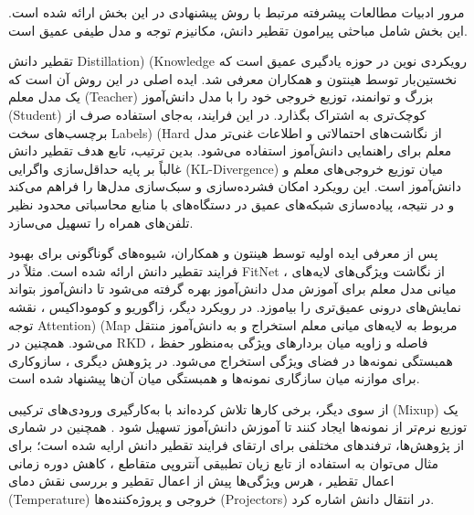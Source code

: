 



مرور ادبیات مطالعات پیشرفته مرتبط با روش پیشنهادی در این بخش ارائه شده است. این بخش شامل مباحثی پیرامون تقطیر دانش، مکانیزم توجه و مدل طیفی عمیق است.


تقطیر دانش Distillation) (Knowledge رویکردی نوین در حوزه یادگیری عمیق است که نخستین‌بار توسط هینتون و همکاران \cite{hinton2015distillingknowledgeneuralnetwork} معرفی شد. ایده اصلی در این روش آن است که یک مدل معلم (Teacher) بزرگ و توانمند، توزیع خروجی خود را با مدل دانش‌آموز (Student) کوچک‌تری به اشتراک بگذارد. در این فرایند، به‌جای استفاده صرف از برچسب‌های سخت Labels) (Hard از نگاشت‌های احتمالاتی و اطلاعات غنی‌تر مدل معلم برای راهنمایی دانش‌آموز استفاده می‌شود. بدین ترتیب، تابع هدف تقطیر دانش غالباً بر پایه حداقل‌سازی واگرایی  (KL-Divergence) میان توزیع خروجی‌های معلم و دانش‌آموز است. این رویکرد امکان فشرده‌سازی و سبک‌سازی مدل‌ها را فراهم می‌کند و در نتیجه، پیاده‌سازی شبکه‌های عمیق در دستگاه‌های با منابع محاسباتی محدود نظیر تلفن‌های همراه را تسهیل می‌سازد.

پس از معرفی ایده اولیه توسط هینتون و همکاران، شیوه‌های گوناگونی برای بهبود فرایند تقطیر دانش ارائه شده است. مثلاً در FitNet \cite{romero2015fitnetshintsdeepnets}، از نگاشت ویژگی‌های لایه‌های میانی مدل معلم برای آموزش مدل دانش‌آموز بهره گرفته می‌شود تا دانش‌آموز بتواند نمایش‌های درونی عمیق‌تری را بیاموزد. در رویکرد دیگر، زاگوریو و کوموداکیس \cite{zagoruyko2017wideresidualnetworks}، نقشه توجه Attention) (Map مربوط به لایه‌های میانی معلم استخراج و به دانش‌آموز منتقل می‌شود. همچنین در RKD \cite{park2019relationalknowledgedistillation}، فاصله و زاویه میان بردارهای ویژگی به‌منظور حفظ همبستگی نمونه‌ها در فضای ویژگی استخراج می‌شود. در پژوهش دیگری \cite{peng2019correlationcongruenceknowledgedistillation}، سازوکاری برای موازنه میان سازگاری نمونه‌ها و همبستگی میان آن‌ها پیشنهاد شده است.

از سوی دیگر، برخی کارها تلاش کرده‌اند با به‌کارگیری ورودی‌های ترکیبی (Mixup) یک توزیع نرم‌تر از نمونه‌ها ایجاد کنند تا آموزش دانش‌آموز تسهیل شود \cite{zhao2021similaritytransferknowledgedistillation}. همچنین در شماری از پژوهش‌ها، ترفندهای مختلفی برای ارتقای فرایند تقطیر دانش ارایه شده است؛ برای مثال می‌توان به استفاده از تابع زیان تطبیقی آنتروپی متقاطع \cite{s20164616}، کاهش دوره زمانی اعمال تقطیر \cite{mansourian2023aicsdadaptiveinterclasssimilarity}، هرس ویژگی‌ها پیش از اعمال تقطیر \cite{park2022prunemodeldistill} و بررسی نقش دمای (Temperature) خروجی و پروژه‌کننده‌ها (Projectors) در انتقال دانش \cite{miles2024understandingroleprojectorknowledge} اشاره کرد.

